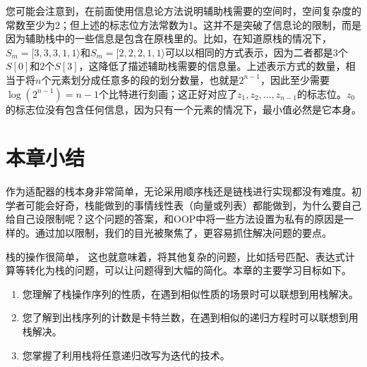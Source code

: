 您可能会注意到，在前面使用信息论方法说明辅助栈需要的空间时，空间复杂度的常数至少为2；但上述的标志位方法常数为1。这并不是突破了信息论的限制，而是因为辅助栈中的一些信息是包含在原栈里的。比如，在知道原栈的情况下，$S_m = [3,3,3,1,1\rangle$和$S_m = [2,2,2,1,1\rangle$可以以相同的方式表示，因为二者都是3个$S[0]$和2个$S[3]$，这降低了描述辅助栈需要的信息量。上述表示方式的数量，相当于将$n$个元素划分成任意多的段的划分数量，也就是$2^{n-1}$，因此至少需要$\log \left(2^{n-1}\right) = n-1$个比特进行刻画；这正好对应了$z_1,z_2,\dots,z_{n-1}$的标志位。$z_0$的标志位没有包含任何信息，因为只有一个元素的情况下，最小值必然是它本身。

\section{本章小结}
作为适配器的栈本身非常简单，无论采用顺序栈还是链栈进行实现都没有难度。初学者可能会好奇，栈能做到的事情线性表（向量或列表）都能做到，为什么要自己给自己设限制呢？这个问题的答案，和OOP中将一些方法设置为私有的原因是一样的。通过加以限制，我们的目光被聚焦了，更容易抓住解决问题的要点。

栈的操作很简单，
这也就意味着，将其他复杂的问题，比如括号匹配、表达式计算等转化为栈的问题，可以让问题得到大幅的简化。本章的主要学习目标如下。
\begin{enumerate}
    \item 您理解了栈操作序列的性质，在遇到相似性质的场景时可以联想到用栈解决。
    \item 您了解到出栈序列的计数是卡特兰数，在遇到相似的递归方程时可以联想到用栈解决。
    \item 您掌握了利用栈将任意递归改写为迭代的技术。
\end{enumerate}









